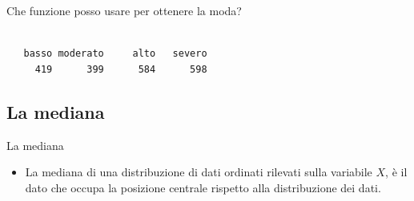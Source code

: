 \documentclass[
  ignorenonframetext,
  compress, aspectratio=149]{beamer}
\newenvironment{Shaded}{\begin{snugshade}}{\end{snugshade}}
\newcommand{\FunctionTok}[1]{\textcolor[rgb]{0.13,0.29,0.53}{\textbf{#1}}}
\newcommand{\NormalTok}[1]{#1}
\newcommand{\SpecialCharTok}[1]{\textcolor[rgb]{0.81,0.36,0.00}{\textbf{#1}}}
\providecommand{\tightlist}{%
  \setlength{\itemsep}{0pt}\setlength{\parskip}{0pt}}
\begin{document}
\begin{frame}[fragile]
Che funzione posso usare per ottenere la moda?

\begin{Shaded}
\end{Shaded}

\begin{verbatim}

   basso moderato     alto   severo 
     419      399      584      598 
\end{verbatim}
\end{frame}

\subsection{La mediana}\label{la-mediana}

\begin{frame}{La mediana}
\begin{itemize}
\tightlist
\item
  La mediana di una distribuzione di dati ordinati rilevati sulla
  variabile \(X\), è il dato che occupa la posizione centrale rispetto
  alla distribuzione dei dati.
\end{itemize}
\end{frame}
\end{document}
